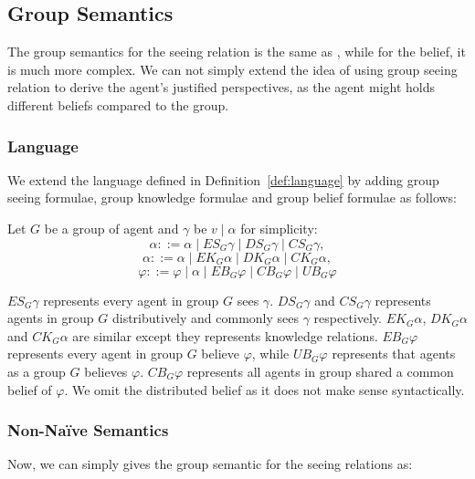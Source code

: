 
\subsection{Group Semantics}
The group semantics for the seeing relation is the same as \cite{Hu2022-ul}, while for the belief, it is much more complex.
We can not simply extend the idea of using group seeing relation to derive the agent's justified perspectives, as the agent might holds different beliefs compared to the group.

\subsubsection{Language} We extend the language defined in Definition~\ref{def:language} by adding group seeing formulae, group knowledge formulae and group belief formulae as follows:

\begin{definition}
\label{def:g_language}
Let $G$ be a group of agent and $\gamma$ be $v \mid \alpha$ for simplicity:
    \[
        \alpha ::= \alpha \mid ES_G \gamma \mid DS_G \gamma \mid CS_G \gamma,
    \]
    \[
        \alpha ::= \alpha \mid EK_G \alpha \mid DK_G \alpha \mid CK_G \alpha,
    \]
    \[
        \varphi ::= \varphi \mid \alpha \mid EB_G \varphi \mid CB_G \varphi \mid UB_G \varphi %
    \]
\end{definition}
\vspace{2mm}

$ES_G \gamma$ represents every agent in group $G$ sees $\gamma$.
$DS_G \gamma$ and $CS_G \gamma$ represents agents in group $G$ distributively and commonly sees $\gamma$ respectively.
$EK_G \alpha$, $DK_G \alpha$ and $CK_G \alpha$ are similar except they represents knowledge relations.
$EB_G \varphi$ represents every agent in group $G$ believe $\varphi$, while $UB_G \varphi$ represents that agents as a group $G$ believes $\varphi$.
$CB_G \varphi$ represents all agents in group shared a common belief of $\varphi$.
We omit the distributed belief as it does not make sense syntactically. 


\subsubsection{Non-Na\"ive Semantics}
Now, we can simply gives the group semantic for the seeing relations as:
\vspace{2mm}

